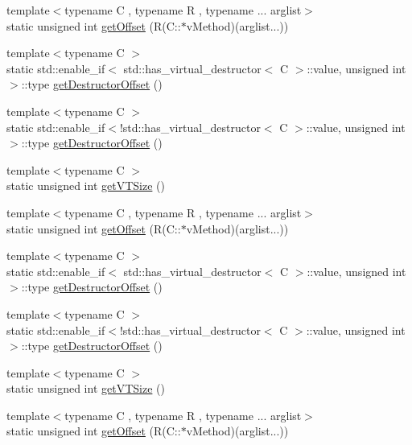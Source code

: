 \begin{DoxyCompactItemize}
\item 
{\footnotesize template$<$typename C , typename R , typename ... arglist$>$ }\\static unsigned int \mbox{\hyperlink{classfakeit_1_1VTUtils_a0e019646d770355889228b1d88675530}{get\+Offset}} (R(C\+::$\ast$v\+Method)(arglist...))
\item 
{\footnotesize template$<$typename C $>$ }\\static std\+::enable\+\_\+if$<$ std\+::has\+\_\+virtual\+\_\+destructor$<$ C $>$\+::value, unsigned int $>$\+::type \mbox{\hyperlink{classfakeit_1_1VTUtils_a9c71030f6040b59ec03cbe326ae1d654}{get\+Destructor\+Offset}} ()
\item 
{\footnotesize template$<$typename C $>$ }\\static std\+::enable\+\_\+if$<$!std\+::has\+\_\+virtual\+\_\+destructor$<$ C $>$\+::value, unsigned int $>$\+::type \mbox{\hyperlink{classfakeit_1_1VTUtils_ac13eea89df8b1656a1bedb9a9bb5c518}{get\+Destructor\+Offset}} ()
\item 
{\footnotesize template$<$typename C $>$ }\\static unsigned int \mbox{\hyperlink{classfakeit_1_1VTUtils_a54ddc7bb539671fbf957920f051a6104}{get\+V\+T\+Size}} ()
\item 
{\footnotesize template$<$typename C , typename R , typename ... arglist$>$ }\\static unsigned int \mbox{\hyperlink{classfakeit_1_1VTUtils_a0e019646d770355889228b1d88675530}{get\+Offset}} (R(C\+::$\ast$v\+Method)(arglist...))
\item 
{\footnotesize template$<$typename C $>$ }\\static std\+::enable\+\_\+if$<$ std\+::has\+\_\+virtual\+\_\+destructor$<$ C $>$\+::value, unsigned int $>$\+::type \mbox{\hyperlink{classfakeit_1_1VTUtils_a9c71030f6040b59ec03cbe326ae1d654}{get\+Destructor\+Offset}} ()
\item 
{\footnotesize template$<$typename C $>$ }\\static std\+::enable\+\_\+if$<$!std\+::has\+\_\+virtual\+\_\+destructor$<$ C $>$\+::value, unsigned int $>$\+::type \mbox{\hyperlink{classfakeit_1_1VTUtils_ac13eea89df8b1656a1bedb9a9bb5c518}{get\+Destructor\+Offset}} ()
\item 
{\footnotesize template$<$typename C $>$ }\\static unsigned int \mbox{\hyperlink{classfakeit_1_1VTUtils_a54ddc7bb539671fbf957920f051a6104}{get\+V\+T\+Size}} ()
\item 
{\footnotesize template$<$typename C , typename R , typename ... arglist$>$ }\\static unsigned int \mbox{\hyperlink{classfakeit_1_1VTUtils_a0e019646d770355889228b1d88675530}{get\+Offset}} (R(C\+::$\ast$v\+Method)(arglist...))

\end{DoxyCompactItemize}
